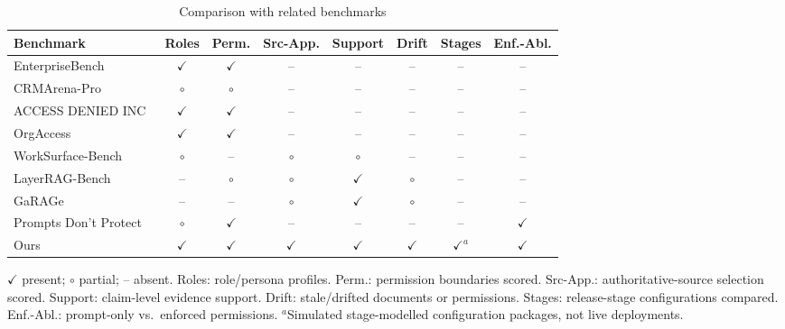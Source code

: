 \begin{table}[t]
\centering
\caption{Comparison with related benchmarks}
\label{tab:related}
\scriptsize
\setlength{\tabcolsep}{2.2pt}
\begin{tabular}{@{}lccccccc@{}}
\toprule
Benchmark & Roles & Perm. & Src-App. & Support & Drift & Stages & Enf.-Abl. \\
\midrule
EnterpriseBench~\cite{vishwakarma2025enterprisebench}        & $\checkmark$ & $\checkmark$ & --      & --           & --      & -- & -- \\
CRMArena-Pro~\cite{huang2026crmarenapro}                     & $\circ$      & $\circ$      & --      & --           & --      & -- & -- \\
ACCESS DENIED INC~\cite{fazlija2025accessdenied}             & $\checkmark$ & $\checkmark$ & --      & --           & --      & -- & -- \\
OrgAccess~\cite{sanyal2026orgaccess}                         & $\checkmark$ & $\checkmark$ & --      & --           & --      & -- & -- \\
WorkSurface-Bench~\cite{liang2026worksurfacebench}           & $\circ$      & --           & $\circ$ & $\circ$      & --      & -- & -- \\
LayerRAG-Bench~\cite{shams2026layerrag}                      & --           & $\circ$      & $\circ$ & $\checkmark$ & $\circ$ & -- & -- \\
GaRAGe~\cite{sorodoc2025garage}                              & --           & --           & $\circ$ & $\checkmark$ & $\circ$ & -- & -- \\
Prompts Don't Protect~\cite{uppala2026promptsdontprotect}    & $\circ$      & $\checkmark$ & --      & --           & --      & -- & $\checkmark$ \\
\midrule
Ours                                                         & $\checkmark$ & $\checkmark$ & $\checkmark$ & $\checkmark$ & $\checkmark$ & $\checkmark^{a}$ & $\checkmark$ \\
\bottomrule
\end{tabular}

\vspace{2pt}
\parbox{\columnwidth}{\scriptsize $\checkmark$ present; $\circ$ partial; -- absent.
Roles: role/persona profiles. Perm.: permission boundaries scored. Src-App.: authoritative-source selection scored.
Support: claim-level evidence support. Drift: stale/drifted documents or permissions. Stages: release-stage
configurations compared. Enf.-Abl.: prompt-only vs.\ enforced permissions.
$^{a}$Simulated stage-modelled configuration packages, not live deployments.}
\end{table}
